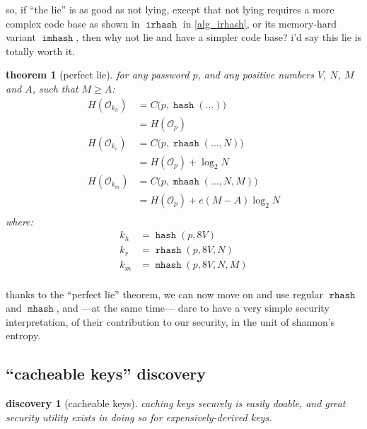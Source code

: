 \documentclass[twocolumn]{article}
\newtheorem{theorem}{theorem}
\newtheorem{discovery}{discovery}
\DeclareMathOperator{\hash}{\mathtt{hash}}
\DeclareMathOperator{\rhash}{\mathtt{rhash}}
\DeclareMathOperator{\mhash}{\mathtt{mhash}}
\DeclareMathOperator{\irhash}{\mathtt{irhash}}
\DeclareMathOperator{\imhash}{\mathtt{imhash}}
\begin{document}
so, if ``the lie'' is as good as not lying, except that not lying requires
a more complex code base as shown in $\irhash$ in \cref{alg_irhash}, or its
memory-hard variant $\imhash$, then why not lie and have a simpler code
base?  i'd say this lie is totally worth it.

\begin{theorem}[perfect lie] \label{theorem_perfect_lie}
    for any password $p$, and any positive numbers $V$, $N$, $M$ and $A$,
    such that $M \ge A$:
    \[\begin{split}
        H(\mathcal{O}_{k_h}) 
            &= C\Big(p, \hash(\ldots)\Big) \\
            &= H(\mathcal{O}_p) \\
        H(\mathcal{O}_{k_r}) 
            &= C\Big(p, \rhash(\ldots, N)\Big) \\
            &= H(\mathcal{O}_p) + \log_2 N \\
        H(\mathcal{O}_{k_m}) 
            &= C\Big(p, \mhash(\ldots, N, M)\Big) \\
            &= H(\mathcal{O}_p) + e(M-A)\log_2 N \\
    \end{split}\]
    where:
    \[\begin{split}
        k_h &= \hash(p, 8V) \\
        k_r &= \rhash(p, 8V, N) \\
        k_m &= \mhash(p, 8V, N, M) \\
    \end{split}\]
\end{theorem}

thanks to the ``perfect lie'' theorem, we can now move on and use regular
$\rhash$ and $\mhash$, and ---at the same time--- dare to have a very
simple security interpretation, of their contribution to our security, in
the unit of shannon's entropy.

\subsection{``cacheable keys'' discovery}
\begin{discovery}[cacheable keys]\label{discov_key_caching}
    caching keys securely is easily doable, and great security utility
    exists in doing so for expensively-derived keys.
\end{discovery}
\end{document}
